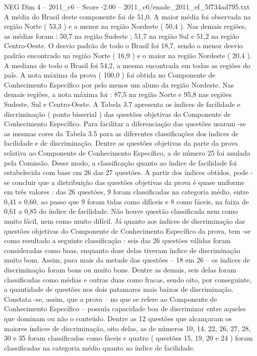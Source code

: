 \begin{textsample}{NEG Dim 4 – 2011\_c6 – Score -2.00 – 2011\_c6/enade\_2011\_ef\_5f734ad795.txt}
A média do Brasil deste componente foi de 51,0.
A maior média foi observada na região Norte ( 53,3 ) e a menor na região Nordeste ( 50,4 ).
Nas demais regiões, as médias foram : 50,7 na região Sudeste ; 51,7 na região Sul e 51,2 na região Centro-Oeste.
O desvio padrão de todo o Brasil foi 18,7, sendo o menor desvio padrão encontrado na região Norte ( 16,9 ) e o maior na região Nordeste ( 20,4 ).
A mediana de todo o Brasil foi 54,2, a mesma encontrada em todas as regiões do país.
A nota máxima da prova ( 100,0 ) foi obtida no Componente de Conhecimento Específico por pelo menos um aluno da região Nordeste.
Nas demais regiões, a nota máxima foi : 87,5 na região Norte e 95,8 nas regiões Sudeste, Sul e Centro-Oeste.
A Tabela 3.7 apresenta os índices de facilidade e discriminação ( ponto bisserial ) das questões objetivas do Componente de Conhecimento Específico.
Para facilitar a diferenciação das questões usaram -se as mesmas cores da Tabela 3.5 para as diferentes classificações dos índices de facilidade e de discriminação.
Dentre as questões objetivas da parte da prova relativa ao Componente de Conhecimento Específico, a de número 25 foi anulada pela Comissão.
Desse modo, a classificação quanto ao índice de facilidade foi estabelecida com base em 26 das 27 questões.
A partir dos índices obtidos, pode -se concluir que a distribuição das questões objetivas da prova é quase uniforme em três valores : das 26 questões, 9 foram classificadas na categoria médio, entre 0,41 e 0,60, ao passo que 9 foram tidas como difíceis e 8 como fáceis, na faixa de 0,61 a 0,85 do índice de facilidade.
Não houve questão classificada nem como muito fácil, nem como muito difícil.
Já quanto aos índices de discriminação das questões objetivas do Componente de Conhecimento Específico da prova, tem -se como resultado a seguinte classificação : seis das 26 questões válidas foram consideradas como boas, enquanto doze delas tiveram índice de discriminação muito bom.
Assim, para mais da metade das questões – 18 em 26 – os índices de discriminação foram bons ou muito bons.
Dentre as demais, seis delas foram classificadas como médias e outras duas como fracas, sendo oito, por conseguinte, a quantidade de questões nos dois patamares mais baixos de discriminação.
Constata -se, assim, que a prova – no que se refere ao Componente de Conhecimento Específico – possuía capacidade boa de discriminar entre aqueles que dominam ou não o conteúdo.
Dentre as 12 questões que alcançaram os maiores índices de discriminação, oito delas, as de números 10, 14, 22, 26, 27, 28, 30 e 35 foram classificadas como fáceis e quatro ( questões 15, 19, 20 e 24 ) foram classificadas na categoria médio quanto ao índice de facilidade.

\end{textsample}
